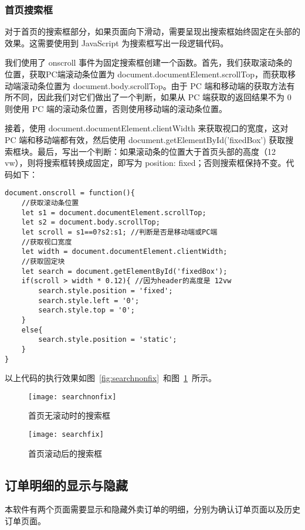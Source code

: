 \subsubsection{首页搜索框}
对于首页的搜索框部分，如果页面向下滑动，需要呈现出搜索框始终固定在头部的效果。这需要使用到 JavaScript 为搜索框写出一段逻辑代码。

我们使用了 onscroll 事件为固定搜索框创建一个函数。首先，我们获取滚动条的位置，获取PC端滚动条位置为 document.documentElement.scrollTop，而获取移动端滚动条位置为 document.body.scrollTop。由于 PC 端和移动端的获取方法有所不同，因此我们对它们做出了一个判断，如果从 PC 端获取的返回结果不为 0 则使用 PC 端的滚动条位置，否则使用移动端的滚动条位置。

接着，使用 document.documentElement.clientWidth 来获取视口的宽度，这对 PC 端和移动端都有效，然后使用 document.getElementById('fixedBox') 获取搜索框块。最后，写出一个判断：如果滚动条的位置大于首页头部的高度（12 vw），则将搜索框转换成固定，即写为 position: fixed；否则搜索框保持不变。代码如下：
\begin{lstlisting}[basicstyle=\footnotesize]
document.onscroll = function(){
    //获取滚动条位置
    let s1 = document.documentElement.scrollTop;
    let s2 = document.body.scrollTop;
    let scroll = s1==0?s2:s1; //判断是否是移动端或PC端
    //获取视口宽度
    let width = document.documentElement.clientWidth;
    //获取固定块
    let search = document.getElementById('fixedBox');
    if(scroll > width * 0.12){ //因为header的高度是 12vw
        search.style.position = 'fixed';
        search.style.left = '0';
        search.style.top = '0';
    }
    else{
        search.style.position = 'static';
    }
}
\end{lstlisting}
以上代码的执行效果如图~\ref{fig:searchnonfix}~和图~\ref{fig:searchfix}~所示。
\begin{figure}[htbp]
    \centering
    \begin{minipage}{0.4\textwidth}
    \centering
    \texttt{[image: searchnonfix]}
    \caption{首页无滚动时的搜索框}\label{fig:searchnonfix}
    \end{minipage}
    \begin{minipage}{0.4\textwidth}
    \centering
    \texttt{[image: searchfix]}
    \caption{首页滚动后的搜索框}\label{fig:searchfix}
    \end{minipage}
    \vspace{\baselineskip}
\end{figure}

\subsection{订单明细的显示与隐藏}
本软件有两个页面需要显示和隐藏外卖订单的明细，分别为确认订单页面以及历史订单页面。

